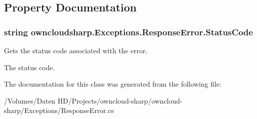 \subsection{Property Documentation}
\hypertarget{classowncloudsharp_1_1_exceptions_1_1_response_error_ab5291c58a78e4c72c2a7d1bf5f1a48c8}{}
\subsubsection[{Status\+Code}]{\setlength{\rightskip}{0pt plus 5cm}string owncloudsharp.\+Exceptions.\+Response\+Error.\+Status\+Code\hspace{0.3cm}{\ttfamily [get]}}\label{classowncloudsharp_1_1_exceptions_1_1_response_error_ab5291c58a78e4c72c2a7d1bf5f1a48c8}


Gets the status code associated with the error. 

The status code.

The documentation for this class was generated from the following file\+:\begin{DoxyCompactItemize}
\item 
/\+Volumes/\+Daten H\+D/\+Projects/owncloud-\/sharp/owncloud-\/sharp/\+Exceptions/Response\+Error.\+cs\end{DoxyCompactItemize}
